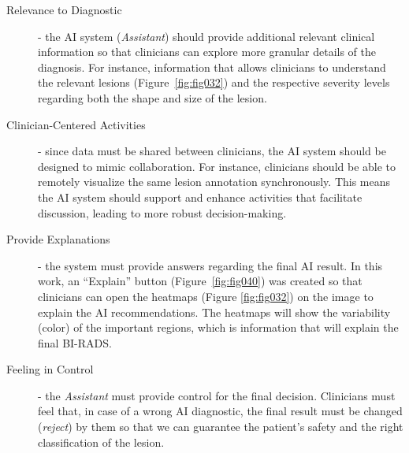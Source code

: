 \vspace{1.50mm}

\begin{description}
\item[Relevance to Diagnostic] - the \ac{AI} system ({\it Assistant}) should provide additional relevant clinical information so that clinicians can explore more granular details of the diagnosis.
For instance, information that allows clinicians to understand the relevant lesions (Figure~\ref{fig:fig032}) and the respective severity levels regarding both the shape and size of the lesion.

\vspace{1.50mm}

\item[Clinician-Centered Activities] - since data must be shared between clinicians, the \ac{AI} system should be designed to mimic collaboration.
For instance, clinicians should be able to remotely visualize the same lesion annotation synchronously.
This means the \ac{AI} system should support and enhance activities that facilitate discussion, leading to more robust decision-making.

\vspace{1.50mm}

\item[Provide Explanations] - the system must provide answers regarding the final \ac{AI} result.
In this work, an ``Explain'' button (Figure~\ref{fig:fig040}) was created so that clinicians can open the heatmaps (Figure \ref{fig:fig032}) on the image to explain the \ac{AI} recommendations.
The heatmaps will show the variability (color) of the important regions, which is information that will explain the final \ac{BI-RADS}.

\vspace{1.50mm}

\item[Feeling in Control] - the {\it Assistant} must provide control for the final decision. Clinicians must feel that, in case of a wrong \ac{AI} diagnostic, the final result must be changed ({\it reject}) by them so that we can guarantee the patient's safety and the right classification of the lesion.
\end{description}

\vspace{2.00mm}

